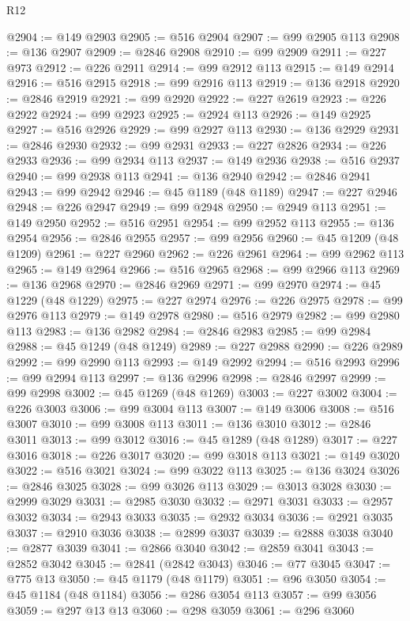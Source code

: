 \begin{lexlean}{R12}
\begin{coremodule}
{{{{{{{{{{{{{{{{{{{{{{{{{{{{{{{{{{{{{{{{{{{{{{{{{{{{{{{{{{{{{{{{{{{{{{{{{{{{{{{{{{{{{{{{{{{{{{{{{{{{{{{{{{@2904 := @149 @2903
@2905 := @516 @2904
@2907 := @99 @2905 @113
@2908 := @136 @2907
@2909 := @2846 @2908
@2910 := @99 @2909
@2911 := @227 @973
@2912 := @226 @2911
@2914 := @99 @2912 @113
@2915 := @149 @2914
@2916 := @516 @2915
@2918 := @99 @2916 @113
@2919 := @136 @2918
@2920 := @2846 @2919
@2921 := @99 @2920
@2922 := @227 @2619
@2923 := @226 @2922
@2924 := @99 @2923
@2925 := @2924 @113
@2926 := @149 @2925
@2927 := @516 @2926
@2929 := @99 @2927 @113
@2930 := @136 @2929
@2931 := @2846 @2930
@2932 := @99 @2931
@2933 := @227 @2826
@2934 := @226 @2933
@2936 := @99 @2934 @113
@2937 := @149 @2936
@2938 := @516 @2937
@2940 := @99 @2938 @113
@2941 := @136 @2940
@2942 := @2846 @2941
@2943 := @99 @2942
@2946 := @45 @1189 (@48 @1189)
@2947 := @227 @2946
@2948 := @226 @2947
@2949 := @99 @2948
@2950 := @2949 @113
@2951 := @149 @2950
@2952 := @516 @2951
@2954 := @99 @2952 @113
@2955 := @136 @2954
@2956 := @2846 @2955
@2957 := @99 @2956
@2960 := @45 @1209 (@48 @1209)
@2961 := @227 @2960
@2962 := @226 @2961
@2964 := @99 @2962 @113
@2965 := @149 @2964
@2966 := @516 @2965
@2968 := @99 @2966 @113
@2969 := @136 @2968
@2970 := @2846 @2969
@2971 := @99 @2970
@2974 := @45 @1229 (@48 @1229)
@2975 := @227 @2974
@2976 := @226 @2975
@2978 := @99 @2976 @113
@2979 := @149 @2978
@2980 := @516 @2979
@2982 := @99 @2980 @113
@2983 := @136 @2982
@2984 := @2846 @2983
@2985 := @99 @2984
@2988 := @45 @1249 (@48 @1249)
@2989 := @227 @2988
@2990 := @226 @2989
@2992 := @99 @2990 @113
@2993 := @149 @2992
@2994 := @516 @2993
@2996 := @99 @2994 @113
@2997 := @136 @2996
@2998 := @2846 @2997
@2999 := @99 @2998
@3002 := @45 @1269 (@48 @1269)
@3003 := @227 @3002
@3004 := @226 @3003
@3006 := @99 @3004 @113
@3007 := @149 @3006
@3008 := @516 @3007
@3010 := @99 @3008 @113
@3011 := @136 @3010
@3012 := @2846 @3011
@3013 := @99 @3012
@3016 := @45 @1289 (@48 @1289)
@3017 := @227 @3016
@3018 := @226 @3017
@3020 := @99 @3018 @113
@3021 := @149 @3020
@3022 := @516 @3021
@3024 := @99 @3022 @113
@3025 := @136 @3024
@3026 := @2846 @3025
@3028 := @99 @3026 @113
@3029 := @3013 @3028
@3030 := @2999 @3029
@3031 := @2985 @3030
@3032 := @2971 @3031
@3033 := @2957 @3032
@3034 := @2943 @3033
@3035 := @2932 @3034
@3036 := @2921 @3035
@3037 := @2910 @3036
@3038 := @2899 @3037
@3039 := @2888 @3038
@3040 := @2877 @3039
@3041 := @2866 @3040
@3042 := @2859 @3041
@3043 := @2852 @3042
@3045 := @2841 (@2842 @3043)
@3046 := @77 @3045
@3047 := @775 @13
@3050 := @45 @1179 (@48 @1179)
@3051 := @96 @3050
@3054 := @45 @1184 (@48 @1184)
@3056 := @286 @3054 @113
@3057 := @99 @3056
@3059 := @297 @13 @13
@3060 := @298 @3059
@3061 := @296 @3060
}}}}}}}}}}}}}}}}}}}}}}}}}}}}}}}}}}}}}}}}}}}}}}}}}}}}}}}}}}}}}}}}}}}}}}}}}}}}}}}}}}}}}}}}}}}}}}}}}}}}}}}}}}
\end{coremodule}
\end{lexlean}
